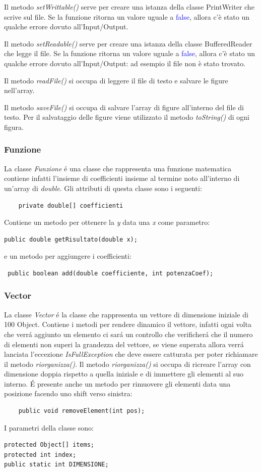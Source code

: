 \documentclass[a4paper,12pt,times,numbered,print,index]{article}
\begin{document}
Il metodo \textit{setWrittable()} serve per creare una istanza della classe PrintWriter che scrive sul file. Se la funzione ritorna un valore uguale a \textcolor{blue}{false}, allora c'è stato un qualche errore dovuto all'Input/Output.

Il metodo \textit{setReadable()} serve per creare una istanza della classe BufferedReader che legge il file. Se la funzione ritorna un valore uguale a \textcolor{blue}{false}, allora c'è stato un qualche errore dovuto all'Input/Output: ad esempio il file non è stato trovato.


Il metodo \textit{readFile()} si occupa di leggere il file di testo e salvare le figure nell'array.

Il metodo \textit{saveFile()} si occupa di salvare l'array di figure all'interno del file di testo. Per il salvataggio delle figure viene utilizzato il metodo \textit{toString()} di ogni figura.

\subsubsection{Funzione}
La classe \textit{Funzione} é una classe che rappresenta una funzione matematica contiene infatti l'insieme di coefficienti insieme al termine noto all'interno di un'array di \textit{double}.
Gli attributi di questa classe sono i seguenti:
\begin{lstlisting}
	private double[] coefficienti
\end{lstlisting}
Contiene un metodo per ottenere la \textit{y} data una \textit{x} come parametro:
\begin{lstlisting}
public double getRisultato(double x);
\end{lstlisting}
e un metodo per aggiungere i coefficienti:
\begin{lstlisting}
 public boolean add(double coefficiente, int potenzaCoef);
\end{lstlisting}

\subsubsection{Vector}
La classe \textit{Vector} é la classe che rappresenta un vettore di dimensione iniziale di 100 Object. Contiene i metodi per rendere dinamico il vettore, infatti ogni volta che verrá aggiunto un elemento ci sará un controllo che verificherá che il numero di elementi non superi la grandezza del vettore, se viene superata allora verrá lanciata l'eccezione \textit{IsFullException} che deve essere catturata per poter richiamare il metodo \textit{riorganizza()}. Il metodo \textit{riorganizza()} si occupa di ricreare l'array con dimensione doppia rispetto a quella iniziale e di immettere gli elementi al suo interno.
É presente anche un metodo per rimuovere gli elementi data una posizione facendo uno shift verso sinistra:
\begin{lstlisting}
	public void removeElement(int pos);
\end{lstlisting}
I parametri della classe sono:
\begin{lstlisting}
protected Object[] items;
protected int index;
public static int DIMENSIONE;
\end{lstlisting}
\end{document}
